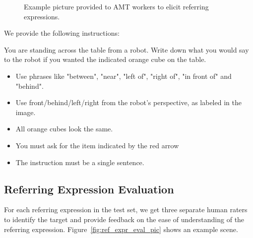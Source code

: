\documentclass[conference]{IEEEtran}
\numberwithin{equation}{section}
\begin{document}
\begin{figure}[!h]
  \centering
  \caption{Example picture provided to AMT workers to elicit referring expressions.}
  \label{fig:ref_expr_examples_pic}
\end{figure}

We provide the following instructions:

\begin{framed}
You are standing across the table from a robot. Write down what you would say to the robot if you wanted the indicated orange cube on the table.
\begin{itemize}[topsep=0pt,itemsep=-1ex,partopsep=1ex,parsep=1ex,leftmargin=1em]
\item Use phrases like "between", "near", "left of", "right of", "in front of" and "behind".
\item Use front/behind/left/right from the robot's perspective, as labeled in the image. 
\item All orange cubes look the same.
\item You must ask for the item indicated by the red arrow
\item The instruction must be a single sentence.
\end{itemize}
\end{framed}

\subsection{Referring Expression Evaluation}

For each referring expression in the test set, we get three separate human raters to identify the target and provide feedback on the ease of understanding of the referring expression. Figure~\ref{fig:ref_expr_eval_pic} shows an example scene.
\end{document}
